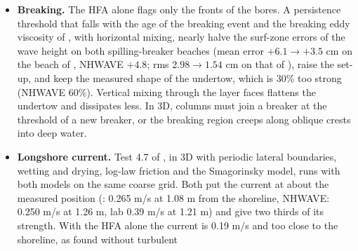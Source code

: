 \begin{itemize}[nosep]
        but the implicit free surface needs a limiter on the outflows (which
        keeps the volume conserved, unlike NHWAVE's clip), and the collocated
        mesh needs the upwind (TVD) depth at the side faces and the upwind
        predicted flux in supercritical flow. With the centred depth of the
        mesh faces the fronts were too slow ($R/d = 0.41$ for the solitary
        wave); with both changes the run-up is 0.531 (NHWAVE 0.512, lab
        0.49--0.55), still water stays at rest on a beach, and the
        parabolic basin is reproduced to 0.9 mm rms. A dam break on a dry
        bed showed that both models treat the film as a wet bed and follow
        Stoker's solution for it, not Ritter's. Parallel runs give the same
        run-up with a processor boundary in the swash zone (0.540 against
        0.531). Around the conical island of \citet{briggs1995} the two
        models on the same grid agree to within 4\% at most gauges and to
        $0.02d$ on average in the run-up; both overshoot on the island's
        face and, in the smaller waves, behind it, as FUNWAVE does, and
        \NHFOAM\ ran 3 to 6 times faster.
  \item \textbf{Breaking.} The HFA alone flags only the fronts of the
        bores. A persistence threshold that falls with the age of the
        breaking event and the breaking eddy viscosity of
        \citet{kennedy2000}, with horizontal mixing, nearly halve the
        surf-zone errors of the wave height on both spilling-breaker beaches (mean
        error $+6.1 \to +3.5$ cm on the beach of \citet{ting1994}, NHWAVE
        $+4.8$; rms $2.98 \to 1.54$ cm on that of \citet{hansen1979}), raise
        the set-up, and keep the measured shape of the undertow, which is
        30\% too strong (NHWAVE 60\%). Vertical mixing through the layer
        faces flattens the undertow and dissipates less. In 3D, columns
        must join a breaker at the threshold of a new breaker, or the
        breaking region creeps along oblique crests into deep water.
  \item \textbf{Longshore current.} Test 4.7 of \citet{ma2012}, in 3D
        with periodic lateral boundaries, wetting and drying, log-law
        friction and the Smagorinsky model, runs with both models on the
        same coarse grid. Both put the current at about the measured
        position (\NHFOAM: 0.265 m/s at 1.08 m from the shoreline, NHWAVE:
        0.250 m/s at 1.26 m, lab 0.39 m/s at 1.21 m) and give two thirds of
        its strength. With the HFA alone the current is 0.19 m/s and too
        close to the shoreline, as \citet{ma2012} found without turbulent

\end{itemize}
